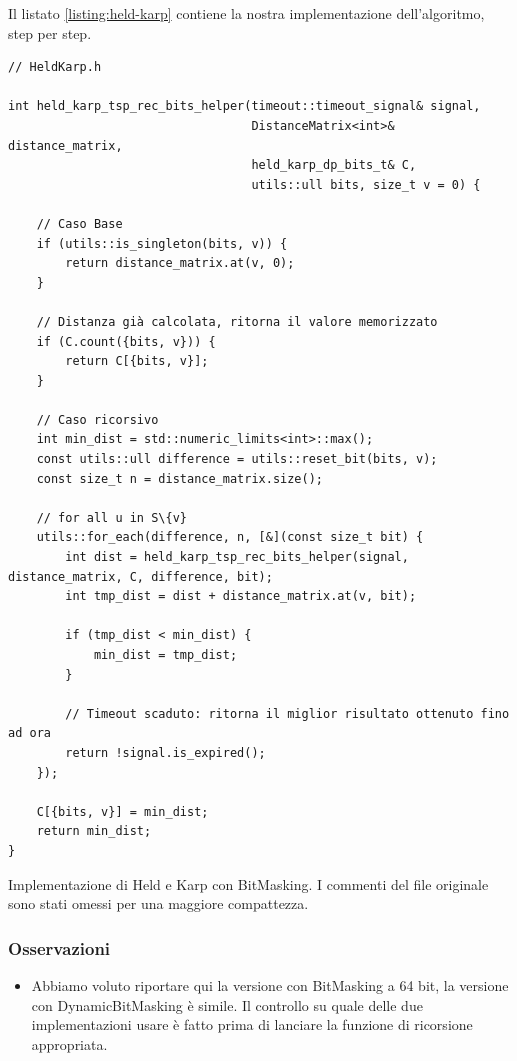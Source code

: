 \noindent Il listato \ref{listing:held-karp} contiene la nostra implementazione dell'algoritmo, step per step.

\begin{listing}[!ht]
\begin{verbatim}
// HeldKarp.h

int held_karp_tsp_rec_bits_helper(timeout::timeout_signal& signal,
                                  DistanceMatrix<int>& distance_matrix,
                                  held_karp_dp_bits_t& C,
                                  utils::ull bits, size_t v = 0) {
    
    // Caso Base
    if (utils::is_singleton(bits, v)) {
        return distance_matrix.at(v, 0);
    }

    // Distanza già calcolata, ritorna il valore memorizzato
    if (C.count({bits, v})) {
        return C[{bits, v}];
    }
    
    // Caso ricorsivo
    int min_dist = std::numeric_limits<int>::max();
    const utils::ull difference = utils::reset_bit(bits, v);
    const size_t n = distance_matrix.size();

    // for all u in S\{v}
    utils::for_each(difference, n, [&](const size_t bit) {
        int dist = held_karp_tsp_rec_bits_helper(signal, distance_matrix, C, difference, bit);
        int tmp_dist = dist + distance_matrix.at(v, bit);

        if (tmp_dist < min_dist) {
            min_dist = tmp_dist;
        }

        // Timeout scaduto: ritorna il miglior risultato ottenuto fino ad ora
        return !signal.is_expired();
    });

    C[{bits, v}] = min_dist;
    return min_dist;
}

\end{verbatim}
\caption{Implementazione di Held e Karp con BitMasking. I commenti del file originale sono stati omessi per una maggiore compattezza.}
\label{listing:held-karp}
\end{listing}

\subsubsection{Osservazioni}

\begin{itemize}
    \item Abbiamo voluto riportare qui la versione con BitMasking a 64 bit, la versione con DynamicBitMasking è simile. Il controllo su quale delle due implementazioni usare è fatto prima di lanciare la funzione di ricorsione appropriata.\\
\end{itemize}

